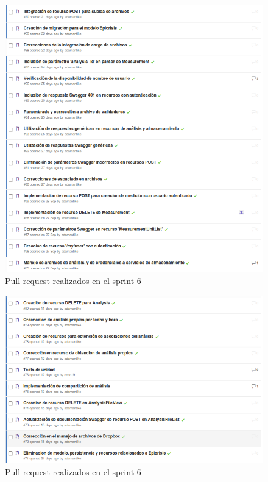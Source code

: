 \documentclass[a4paper,12pt]{article}
\begin{document}
\begin{figure}[h!]
  \centering
  \includegraphics[width=.8\textwidth]{img/6-PR_1}
  \caption{Pull request realizados en el sprint  6}
  \label{6-PR_1}
\end{figure}

\begin{figure}[h!]
	\centering
	\includegraphics[width=.8\textwidth]{img/6-PR_2}
	\caption{Pull request realizados en el sprint 6}
	\label{6-PR_1}
\end{figure}
\clearpage
\end{document}
